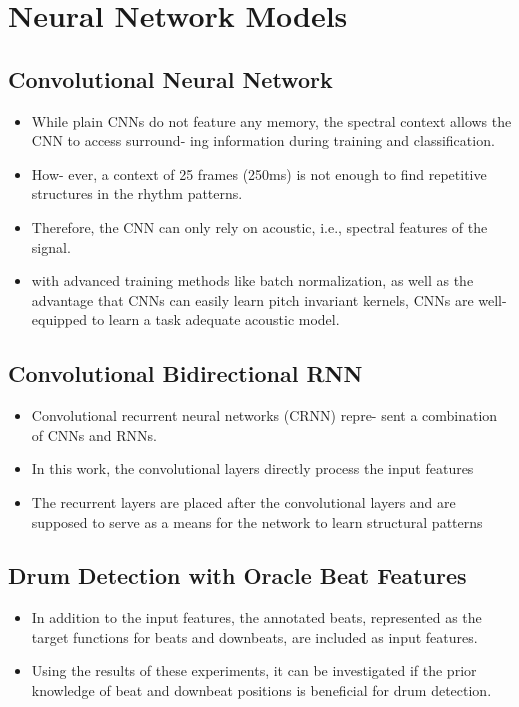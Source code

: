 \section*{Neural Network Models}


\subsection*{Convolutional Neural Network}
\begin{itemize}
\item While plain CNNs do not feature any memory, the spectral context allows the CNN to access surround- ing information during training and classification. 
\item How- ever, a context of 25 frames (250ms) is not enough to find repetitive structures in the rhythm patterns. 
\item Therefore, the CNN can only rely on acoustic, i.e., spectral features of the signal. 
\item with advanced training methods like batch normalization, as well as the advantage that CNNs can easily learn pitch invariant kernels, CNNs are well- equipped to learn a task adequate acoustic model. 
\end{itemize}

\subsection*{Convolutional Bidirectional RNN}
\begin{itemize}
\item Convolutional recurrent neural networks (CRNN) repre- sent a combination of CNNs and RNNs. 
\item In this work, the convolutional layers directly process the input features 
\item The recurrent layers are placed after the convolutional layers and are supposed to serve as a means for the network to learn structural patterns 
\end{itemize}

\subsection*{Drum Detection with Oracle Beat Features}
\begin{itemize}
\item In addition to the input features, the annotated beats, represented as the target functions for beats and downbeats, are included as input features. 
\item Using the results of these experiments, it can be investigated if the prior knowledge of beat and downbeat positions is beneficial for drum detection. 
\end{itemize}

